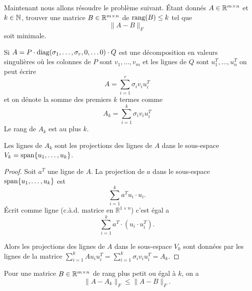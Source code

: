 Maintenant nous allons résoudre le problème suivant. Étant donnés $A \in \mathbb{R}^{m \times n}$ et $k \in \mathbb{N}$, trouver une matrice $B \in \mathbb{R}^{m \times n}$ de $\operatorname{rang}(B) \leq  k$ tel que 
\begin{displaymath}
  \|A - B\|_F
\end{displaymath}
soit minimale. 

Si $A = P \cdot \operatorname{diag}(\sigma_1,\dots,\sigma_r,0,\dots 0) \cdot Q$ est une décomposition en valeurs singulières où les colonnes de $P$ sont $v_1,\dots,v_m$ et les lignes de $Q$ sont $u_1^T,\dots,u_n^T$ on peut écrire
\begin{equation}
  \label{eq:18}
  A = \sum_{i=1}^r \sigma_i v_iu_i^T
\end{equation}
et on dénote la somme des premiers $k$ termes comme 
\begin{displaymath}
  A_k = \sum_{i=1}^k \sigma_i v_iu_i^T
\end{displaymath}
Le rang de $A_k$ est au plus $k$. 

\begin{lemma}
  \label{lem:12}
  Les lignes de $A_k$ sont les projections des lignes de $A$ dans le sous-espace $V_k = \operatorname{span}\{u_1,\dots,u_k\}$. 
\end{lemma}

\begin{proof}
  Soit $a^T$ une ligne de $A$. La projection de $a$ dans le sous-espace $\operatorname{span}\{u_1,\dots,u_k\}$ est 
  \begin{displaymath}
    \sum_{i=1}^k a^Tu_i \cdot u_i. 
  \end{displaymath}
  Écrit comme ligne (c.à.d. matrice en $ℝ^{1 × n}$) c'est égal a
 \begin{displaymath}
    \sum_{i=1}^k a^T ⋅ (u_i \cdot u_i^T). 
  \end{displaymath}
  
Alors les projections des lignes de $A$ dans le sous-espace $V_k$ sont données par les lignes de la matrice $\sum_{i=1}^k A u_i u_i^T = \sum_{i=1}^k \sigma_i v_i u_i^T = A_k$.  
\end{proof}

\begin{theorem}
  \label{thr:27}
  Pour une matrice $B \in \mathbb{R}^{m \times n}$ de rang plus petit ou égal à $k$, on a 
  \begin{displaymath}
    \|A - A_k\|_F \leq \|A - B\|_F.
  \end{displaymath}
\end{theorem}

